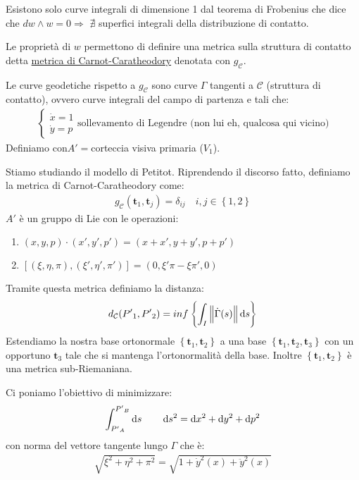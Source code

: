 Esistono solo curve integrali di dimensione 1 dal teorema di Frobenius che dice che $dw \wedge w=0\Rightarrow$ $\nexists$ superfici integrali della distribuzione di contatto.

Le proprietà di $w$ permettono di definire una metrica sulla struttura di contatto detta \ul{metrica di Carnot-Caratheodory} denotata con $g_\mathcal{C}$.

Le curve geodetiche rispetto a $g_\mathcal{C}$ sono curve $\Gamma$ tangenti a $\mathcal{C}$ (struttura di contatto), ovvero curve integrali del campo di partenza e tali che:
\begin{align*}
    \begin{cases*}
        \dot{x}=1\\
        \dot{y}=p
    \end{cases*}\text{sollevamento di Legendre (non lui eh, qualcosa qui vicino)}
\end{align*}
Definiamo con$A'=$corteccia visiva primaria ($V_1$).

Stiamo studiando il modello di Petitot. Riprendendo il discorso fatto, definiamo la metrica di Carnot-Caratheodory come:
\begin{align*}
    g_{\mathcal{C}}(\bm{t}_1,\bm{t}_j)=\delta_{ij}\quad i,j\in \left\{1,2\right\}
\end{align*}
$A'$ è un gruppo di Lie con le operazioni:
\begin{enumerate}
    \item $(x,y,p)\cdot (x',y',p')=(x+x',y+y',p+p')$
    \item $[(\xi,\eta,\pi),(\xi',\eta',\pi')]=(0,\xi'\pi-\xi\pi',0)$
\end{enumerate}
Tramite questa metrica definiamo la distanza:
\begin{align*}
    d_{\mathcal{C}}({P'}_1,{P'}_2)=inf\left\{\int_I \norma{\dot{\Gamma}(s)}\dif s\right\}
\end{align*}
Estendiamo la nostra base ortonormale $\left\{\bm{t}_1,\bm{t}_2\right\}$ a una base $\left\{\bm{t}_1,\bm{t}_2,\bm{t}_3\right\}$ con un opportuno $\bm{t}_3$ tale che si mantenga l'ortonormalità della base.
Inoltre $\left\{\bm{t}_1,\bm{t}_2\right\}$ è una metrica sub-Riemaniana.

Ci poniamo l'obiettivo di minimizzare:
\begin{align*}
    \int_{{P'}_A}^{{P'}_{B}} \dif s \quad \quad \dif s^2=\dif x^2+\dif y^2+\dif p^2
\end{align*}
con norma del vettore tangente lungo $\Gamma$ che è:
\begin{align*}
    \sqrt{\xi^2+\eta^2+\pi^2}= \sqrt{1+\dot{y}^2(x)+\ddot{y}^2(x)}
\end{align*}


